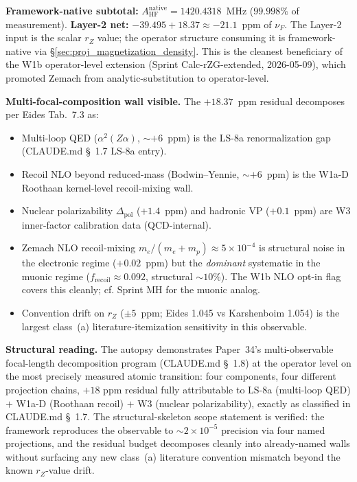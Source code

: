 \documentclass[11pt]{article}
\begin{document}
\textbf{Framework-native subtotal:} $A_\text{HF}^\text{native}\!=\!1420.4318$~MHz
($99.998\%$ of measurement).  \textbf{Layer-2 net:} $-39.495 + 18.37
\approx -21.1$~ppm of $\nu_F$.  The Layer-2 input is the scalar $r_Z$
value; the operator structure consuming it is framework-native via
\S\ref{sec:proj_magnetization_density}.  This is the cleanest
beneficiary of the W1b operator-level extension (Sprint
Calc-rZG-extended, 2026-05-09), which promoted Zemach from
analytic-substitution to operator-level.

\textbf{Multi-focal-composition wall visible.}  The $+18.37$~ppm
residual decomposes per Eides Tab.~7.3 as:
\begin{itemize}\setlength\itemsep{0pt}
\item Multi-loop QED ($\alpha^2(Z\alpha)$, $\sim+6$~ppm) is the
LS-8a renormalization gap (CLAUDE.md \S~1.7 LS-8a entry).
\item Recoil NLO beyond reduced-mass (Bodwin--Yennie, $\sim +6$~ppm)
is the W1a-D Roothaan kernel-level recoil-mixing wall.
\item Nuclear polarizability $\Delta_\text{pol}$ ($+1.4$~ppm) and
hadronic VP ($+0.1$~ppm) are W3 inner-factor calibration data
(QCD-internal).
\item Zemach NLO recoil-mixing $m_e/(m_e+m_p) \approx 5 \times 10^{-4}$
is structural noise in the electronic regime ($+0.02$~ppm) but the
\emph{dominant} systematic in the muonic regime
($f_\text{recoil} \approx 0.092$, structural $\sim 10\%$).  The W1b
NLO opt-in flag covers this cleanly; cf. Sprint MH for the muonic
analog.
\item Convention drift on $r_Z$ ($\pm 5$~ppm; Eides 1.045 vs
Karshenboim 1.054) is the largest class~(a) literature-itemization
sensitivity in this observable.
\end{itemize}

\textbf{Structural reading.}  The autopsy demonstrates Paper~34's
multi-observable focal-length decomposition program (CLAUDE.md
\S~1.8) at the operator level on the most precisely measured atomic
transition: four components, four different projection chains, $+18$
ppm residual fully attributable to LS-8a (multi-loop QED) $+$ W1a-D
(Roothaan recoil) $+$ W3 (nuclear polarizability), exactly as
classified in CLAUDE.md \S~1.7.  The structural-skeleton scope
statement is verified: the framework reproduces the observable to
$\sim 2 \times 10^{-5}$ precision via four named projections, and
the residual budget decomposes cleanly into already-named walls
without surfacing any new class~(a) literature convention mismatch
beyond the known $r_Z$-value drift.
\end{document}
